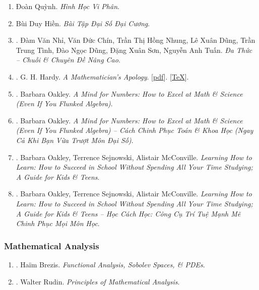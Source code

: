 \documentclass{article}
\begin{document}
\begin{enumerate}
	\item Đoàn Quỳnh. \textit{Hình Học Vi Phân}.
	\item Bùi Duy Hiền. \textit{Bài Tập Đại Số Đại Cương}.
	\item \cite{Nhi_Chin_Dung_Dung_Tinh_Dung_Son_Tuan2017}. Đàm Văn Nhỉ, Văn Đức Chín, Trần Thị Hồng Nhung, Lê Xuân Dũng, Trần Trung Tình, Đào Ngọc Dũng, Đặng Xuân Sơn, Nguyễn Anh Tuấn. \textit{Đa Thức -- Chuỗi \& Chuyên Đề Nâng Cao}.
	\item \cite{Hardy1940, Hardy1992, Hardy2022}. G. H. Hardy. \textit{A Mathematician's Apology}. [\href{https://github.com/NQBH/hobby/blob/master/advanced_mathematics/Hardy2017/NQBH_Hardy2017.pdf}{pdf}]. [\href{https://github.com/NQBH/hobby/blob/master/advanced_mathematics/Hardy2017/NQBH_Hardy2017.tex}{\TeX}].\hfill{\sf[finished]}
	\item \cite{Oakley2014}. Barbara Oakley. \textit{A Mind for Numbers: How to Excel at Math \& Science (Even If You Flunked Algebra)}.\hfill{\sf[reading]}
	\item \cite{Oakley2022}. Barbara Oakley. \textit{A Mind for Numbers: How to Excel at Math \& Science (Even If You Flunked Algebra) -- Cách Chinh Phục Toán \& Khoa Học (Ngay Cả Khi Bạn Vừa Trượt Môn Đại Số)}.\hfill{\sf[finished]}
	\item \cite{Oakley_Sejnowski_McConville2018}. Barbara Oakley, Terrence Sejnowski, Alistair McConville. \textit{Learning How to Learn: How to Succeed in School Without Spending All Your Time Studying; A Guide for Kids \& Teens}.\hfill{\sf[reading]}
	\item \cite{Oakley_Sejnowski_McConville2022}. Barbara Oakley, Terrence Sejnowski, Alistair McConville. \textit{Learning How to Learn: How to Succeed in School Without Spending All Your Time Studying; A Guide for Kids \& Teens -- Học Cách Học: Công Cụ Trí Tuệ Mạnh Mẽ Chinh Phục Mọi Môn Học}.\hfill{\sf[finished]}
\end{enumerate}

\subsubsection{Mathematical Analysis}

\begin{enumerate}
	\item \cite{Brezis2011}. Ha\"im Brezis. \textit{Functional Analysis, Sobolev Spaces, \& PDEs}.\hfill{\sf[reading]}
	\item \cite{Rudin1976}. Walter Rudin. \textit{Principles of Mathematical Analysis}.\hfill{\sf[finished]}
\end{enumerate}
\end{document}

